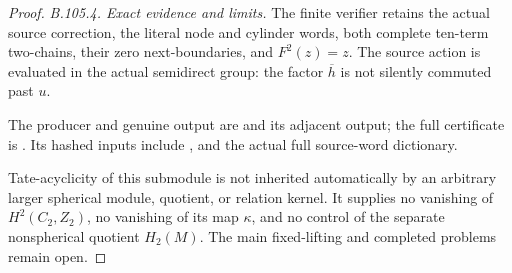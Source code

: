 \begin{proof}
\emph{B.105.4. Exact evidence and limits.}
The finite verifier retains the actual source correction, the
literal node and cylinder words, both complete ten-term
two-chains, their zero next-boundaries, and $F^2(z)=z$.
The source action is evaluated in the actual semidirect group:
the factor $\overline h$ is not silently commuted past $u$.

\begingroup\raggedright
The producer and genuine output are
and its adjacent output; the full certificate is
.
Its hashed inputs include
,
and the actual full source-word dictionary.\par
\endgroup

Tate-acyclicity of this submodule is not inherited automatically
by an arbitrary larger spherical module, quotient, or relation
kernel. It supplies no vanishing of $H^2(C_2,Z_2)$, no vanishing
of its map $\kappa$, and no control of the separate nonspherical
quotient $H_2(M)$. The main fixed-lifting and completed problems
remain open.
\end{proof}
